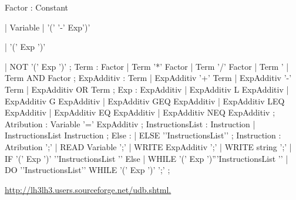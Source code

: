 Factor : Constant              

| Variable 
| '(' '-' Exp')'               

| '(' Exp ')'                

| NOT '(' Exp ')'            
;
Term : Factor            
|  Term '*' Factor       
|  Term '/' Factor       
|  Term '%
|  Term AND Factor       
;                                             
ExpAdditiv : Term      
| ExpAdditiv '+' Term  
| ExpAdditiv '-' Term  
| ExpAdditiv OR  Term  
;                                         
Exp : ExpAdditiv            
|  ExpAdditiv L   ExpAdditiv
|  ExpAdditiv G   ExpAdditiv
|  ExpAdditiv GEQ ExpAdditiv
|  ExpAdditiv LEQ ExpAdditiv
|  ExpAdditiv EQ  ExpAdditiv
|  ExpAdditiv NEQ ExpAdditiv
;                                      
Atribution :  Variable '=' ExpAdditiv    
;
InstructionsList : Instruction           
| InstructionsList Instruction           
;
Else :         
|            
ELSE '{'InstructionsList'}'  
;
Instruction : Atribution ';'           
| READ  Variable ';'      
| WRITE ExpAdditiv ';'    
| WRITE string ';'        
| IF '('  Exp ')' '{'InstructionsList '}' Else          
| WHILE '(' Exp ')''{'InstructionsList '}'  
| DO '{'InstructionsList'}' WHILE '(' Exp ')' ';' 
;





\url{http://lh3lh3.users.sourceforge.net/udb.shtml.}
